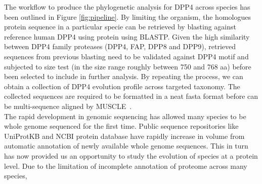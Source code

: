 The workflow to produce the phylogenetic analysis for DPP4 across species has been outlined in Figure \ref{fig:pipeline}. By limiting the organism, the homologues protein sequence in a particular specie can be retrieved by blasting against reference human DPP4 using protein using BLASTP. Given the high similarity between DPP4 family proteases (DPP4, FAP, DPP8 and DPP9), retrieved sequences from previous blasting need to be validated against DPP4 motif and subjected to size test (in the size range roughly between 750 and 768 aa) before been selected to include in further analysis. By repeating the process, we can obtain a collection of DPP4 evolution profile across targeted taxonomy. The collected sequences are required to be formatted in a neat fasta format before can be multi-sequence aligned by MUSCLE~\cite{15318951}. \\

The rapid development in genomic sequencing has allowed many species to be whole genome sequenced for the first time. Public sequence repositories like UniProtKB and NCBI protein database have rapidly increase in volume from automatic annotation of newly available whole genome sequences. This in turn has now provided us an opportunity to study the evolution of species at a protein level.  Due to the limitation of incomplete annotation of proteome across many species, 
